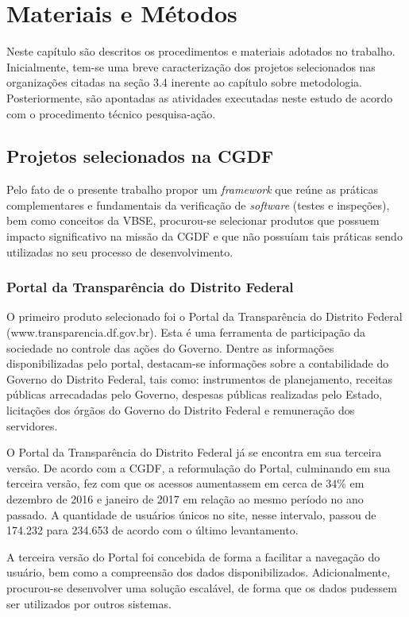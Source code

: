 \chapter{Materiais e Métodos}

Neste capítulo são descritos os procedimentos e materiais adotados no trabalho. Inicialmente, tem-se uma breve caracterização dos projetos selecionados nas organizações citadas na seção 3.4 inerente ao capítulo sobre metodologia. Posteriormente, são apontadas as atividades executadas neste estudo de acordo com o procedimento técnico pesquisa-ação.

\section{Projetos selecionados na CGDF}

Pelo fato de o presente trabalho propor um \textit{framework} que reúne as práticas complementares e fundamentais da verificação de \textit{software} (testes e inspeções), bem como conceitos da VBSE, procurou-se selecionar produtos que possuem impacto significativo na missão da CGDF e que não possuíam tais práticas sendo utilizadas no seu processo de desenvolvimento.

\subsection{Portal da Transparência do Distrito Federal}

O primeiro produto selecionado foi o Portal da Transparência do Distrito Federal (www.transparencia.df.gov.br). Esta é uma ferramenta de participação da sociedade no controle das ações do Governo. Dentre as informações disponibilizadas pelo portal, destacam-se informações sobre a contabilidade do Governo do Distrito Federal, tais como: instrumentos de planejamento, receitas públicas arrecadadas pelo Governo, despesas públicas realizadas pelo Estado, licitações dos órgãos do Governo do Distrito Federal e remuneração dos servidores.

O Portal da Transparência do Distrito Federal já se encontra em sua terceira versão. De acordo com a CGDF, a reformulação do Portal, culminando em sua terceira versão, fez com que os acessos aumentassem em cerca de 34\% em dezembro de 2016 e janeiro de 2017 em relação ao mesmo período no ano passado. A quantidade de usuários únicos no site, nesse intervalo, passou de 174.232 para 234.653 de acordo com o último levantamento.

A terceira versão do Portal foi concebida de forma a facilitar a navegação do usuário, bem como a compreensão dos dados disponibilizados. Adicionalmente, procurou-se desenvolver uma solução escalável, de forma que os dados pudessem ser utilizados por outros sistemas.

